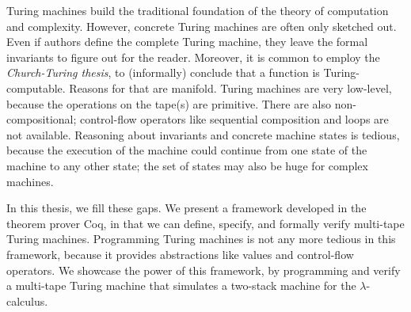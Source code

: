 Turing machines build the traditional foundation of the theory of computation and complexity.  However, concrete Turing machines are often only
sketched out.  Even if authors define the complete Turing machine, they leave the formal invariants to figure out for the reader.  Moreover, it is
common to employ the \textit{Church-Turing thesis}, to (informally) conclude that a function is Turing-computable.  Reasons for that are manifold.
Turing machines are very low-level, because the operations on the tape(s) are primitive.  There are also non-compositional; control-flow operators
like sequential composition and loops are not available.  Reasoning about invariants and concrete machine states is tedious, because the execution of
the machine could continue from one state of the machine to any other state; the set of states may also be huge for complex machines.

In this thesis, we fill these gaps.  We present a framework developed in the theorem prover Coq, in that we can define, specify, and formally verify
multi-tape Turing machines.  Programming Turing machines is not any more tedious in this framework, because it provides abstractions like values and
control-flow operators.  We showcase the power of this framework, by programming and verify a multi-tape Turing machine that simulates a two-stack
machine for the $\lambda$-calculus.



